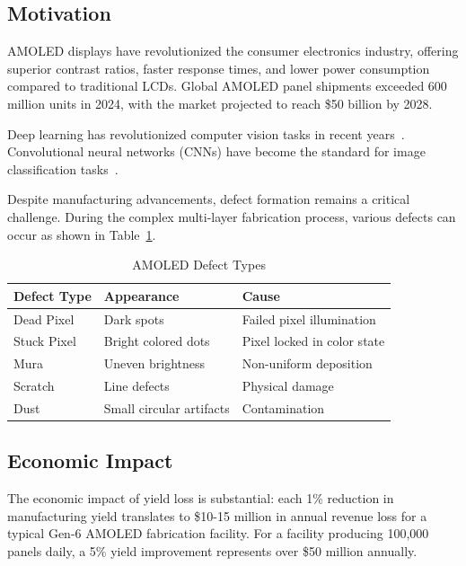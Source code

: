 \documentclass[12pt,a4paper]{article}
\begin{document}
\subsection{Motivation}

AMOLED displays have revolutionized the consumer electronics industry, 
offering superior contrast ratios, faster response times, and lower power 
consumption compared to traditional LCDs. Global AMOLED panel shipments 
exceeded 600 million units in 2024, with the market projected to reach 
\$50 billion by 2028.

Deep learning has revolutionized computer vision tasks in recent 
years~\cite{alzubaidi2021review,he2016deep}. Convolutional neural 
networks (CNNs) have become the standard for image classification 
tasks~\cite{simonyan2014very,szegedy2015going}.

Despite manufacturing advancements, defect formation remains a critical 
challenge. During the complex multi-layer fabrication process, various 
defects can occur as shown in Table~\ref{tab:defect_types}.

\begin{table}[H]
\centering
\caption{AMOLED Defect Types}
\label{tab:defect_types}
\begin{tabular}{lll}
\toprule
\textbf{Defect Type} & \textbf{Appearance} & \textbf{Cause} \\
\midrule
Dead Pixel & Dark spots & Failed pixel illumination \\
Stuck Pixel & Bright colored dots & Pixel locked in color state \\
Mura & Uneven brightness & Non-uniform deposition \\
Scratch & Line defects & Physical damage \\
Dust & Small circular artifacts & Contamination \\
\bottomrule
\end{tabular}
\end{table}

\subsection{Economic Impact}

The economic impact of yield loss is substantial: each 1\% reduction in 
manufacturing yield translates to \$10-15 million in annual revenue loss 
for a typical Gen-6 AMOLED fabrication facility. For a facility producing 
100,000 panels daily, a 5\% yield improvement represents over \$50 million 
annually.
\end{document}
